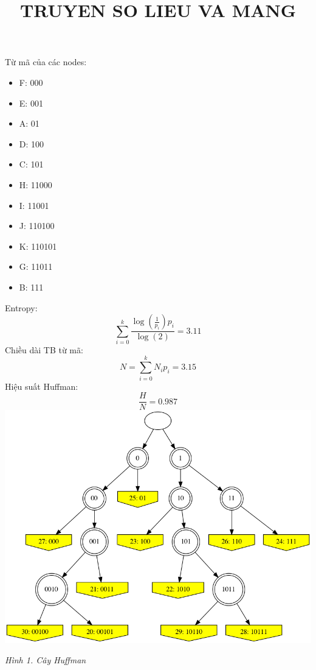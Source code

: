 \documentclass{article}
\title{TRUYEN SO LIEU VA MANG}
\begin{document}
Từ mã của các nodes: 
\begin{itemize}
\item F: 000
\item E: 001
\item A: 01
\item D: 100
\item C: 101
\item H: 11000
\item I: 11001
\item J: 110100
\item K: 110101
\item G: 11011
\item B: 111
\end{itemize}
Entropy:
\[
\sum_{i=0}^{k} \frac{\log{\left(\frac{1}{{p}_{i}} \right)} {p}_{i}}{\log{\left(2 \right)}} = 3.11
\]
Chiều dài TB từ mã:
\[
N = \sum_{i=0}^{k} {N}_{i} {p}_{i} = 3.15
\]
Hiệu suất Huffman:
\[
\frac{H}{N} = 0.987
\]
\includegraphics[width=\textwidth]{graph.png}
\begin{center}
\textit{Hình 1. Cây Huffman}
\end{center}
\end{document}

